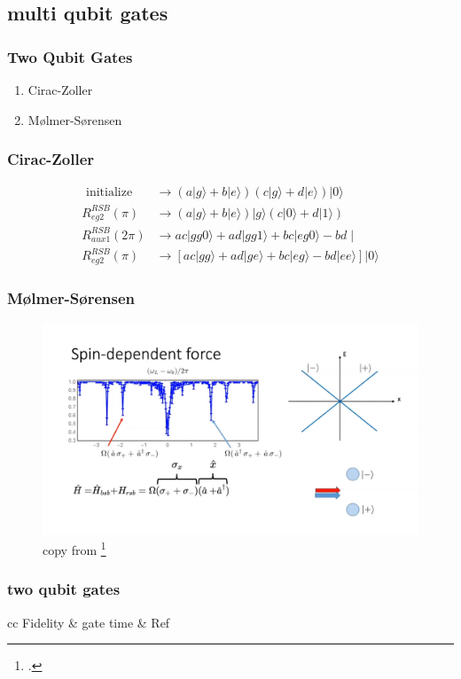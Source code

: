 \documentclass[18 pt]{beamer}
\begin{document}
\subsection{multi qubit gates}
\begin{frame}
  \frametitle{Two Qubit Gates}
  \begin{enumerate}
    \item Cirac-Zoller
    \item Mølmer-Sørensen
  \end{enumerate}
\end{frame}
\begin{frame}
  \frametitle{Cirac-Zoller}
  \begin{align}
    \text { initialize } & \rightarrow(a|g\rangle+b|e\rangle)(c|g\rangle+d|e\rangle)|0\rangle \\
    R_{e g 2}^{R S B}(\pi) & \rightarrow(a|g\rangle+b|e\rangle)|g\rangle(c|0\rangle+d|1\rangle) \\
    R_{a u x 1}^{R S B}(2 \pi) & \rightarrow a c|g g 0\rangle+a d|g g 1\rangle+b c|e g 0\rangle-b d \mid \\
    R_{e g 2}^{R S B}(\pi) & \rightarrow \left[a c|g g\rangle+a d|g e\rangle+b c|e g\rangle-b d|e e\rangle\right]|0\rangle
    \end{align}
\end{frame}
\begin{frame}
  \frametitle{Mølmer-Sørensen}
  \begin{figure}
    \includegraphics[width=.8\textwidth]{M.png}
    \caption{copy from \footcite{https://www.youtube.com/watch?v=uNTNsfxoKYQ&t=2026s}}
  \end{figure}
\end{frame}
\begin{frame}
  \frametitle{two qubit gates}
  \begin{table}[]
    \begin{tabular}{cc}
    Fidelity & gate time & Ref\\
    \end{tabular}
  \end{table}
\end{frame}
\end{document}

